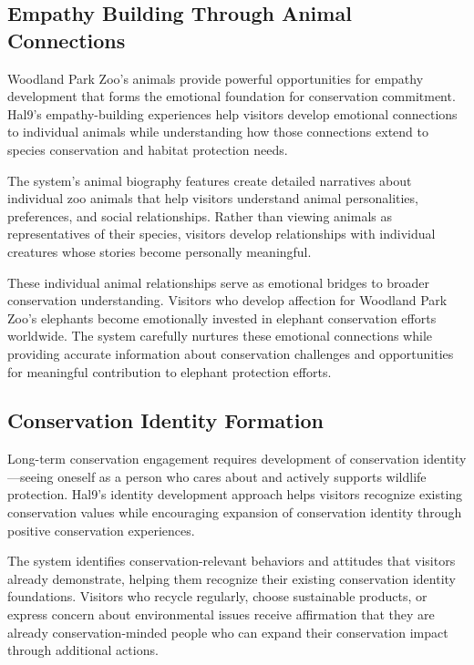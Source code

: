 \documentclass[
  Letterpaper,
]{scrbook}
\begin{document}
\subsection{Empathy Building Through Animal
Connections}\label{empathy-building-through-animal-connections}

Woodland Park Zoo's animals provide powerful opportunities for empathy
development that forms the emotional foundation for conservation
commitment. Hal9's empathy-building experiences help visitors develop
emotional connections to individual animals while understanding how
those connections extend to species conservation and habitat protection
needs.

The system's animal biography features create detailed narratives about
individual zoo animals that help visitors understand animal
personalities, preferences, and social relationships. Rather than
viewing animals as representatives of their species, visitors develop
relationships with individual creatures whose stories become personally
meaningful.

These individual animal relationships serve as emotional bridges to
broader conservation understanding. Visitors who develop affection for
Woodland Park Zoo's elephants become emotionally invested in elephant
conservation efforts worldwide. The system carefully nurtures these
emotional connections while providing accurate information about
conservation challenges and opportunities for meaningful contribution to
elephant protection efforts.

\subsection{Conservation Identity
Formation}\label{conservation-identity-formation}

Long-term conservation engagement requires development of conservation
identity---seeing oneself as a person who cares about and actively
supports wildlife protection. Hal9's identity development approach helps
visitors recognize existing conservation values while encouraging
expansion of conservation identity through positive conservation
experiences.

The system identifies conservation-relevant behaviors and attitudes that
visitors already demonstrate, helping them recognize their existing
conservation identity foundations. Visitors who recycle regularly,
choose sustainable products, or express concern about environmental
issues receive affirmation that they are already conservation-minded
people who can expand their conservation impact through additional
actions.
\end{document}
